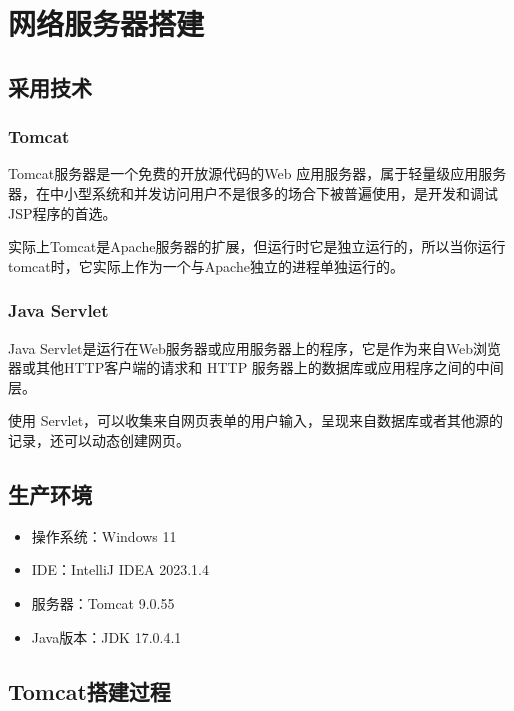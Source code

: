 \documentclass[UTF8,12pt]{article}
\newcommand\myemptypage{
    \null
    \thispagestyle{empty}
    \addtocounter{page}{-1}
    \newpage
}
\begin{document}
\begin{titlepage}
    
\end{titlepage}

\myemptypage

\begin{center}
    \tableofcontents
\end{center}
\newpage

\section{网络服务器搭建}
\subsection{采用技术}
\subsubsection{Tomcat}

Tomcat服务器是一个免费的开放源代码的Web 应用服务器，属于轻量级应用服务器，在中小型系统和并发访问用户不是很多的场合下被普遍使用，是开发和调试JSP程序的首选。

实际上Tomcat是Apache服务器的扩展，但运行时它是独立运行的，所以当你运行tomcat时，它实际上作为一个与Apache独立的进程单独运行的。

\subsubsection{Java Servlet}
Java Servlet是运行在Web服务器或应用服务器上的程序，它是作为来自Web浏览器或其他HTTP客户端的请求和 HTTP 服务器上的数据库或应用程序之间的中间层。

使用 Servlet，可以收集来自网页表单的用户输入，呈现来自数据库或者其他源的记录，还可以动态创建网页。

\subsection{生产环境}
\begin{itemize}
    \item 操作系统：Windows 11
    \item IDE：IntelliJ IDEA 2023.1.4
    \item 服务器：Tomcat 9.0.55
    \item Java版本：JDK 17.0.4.1
\end{itemize}

\subsection{Tomcat搭建过程}
\end{document}
